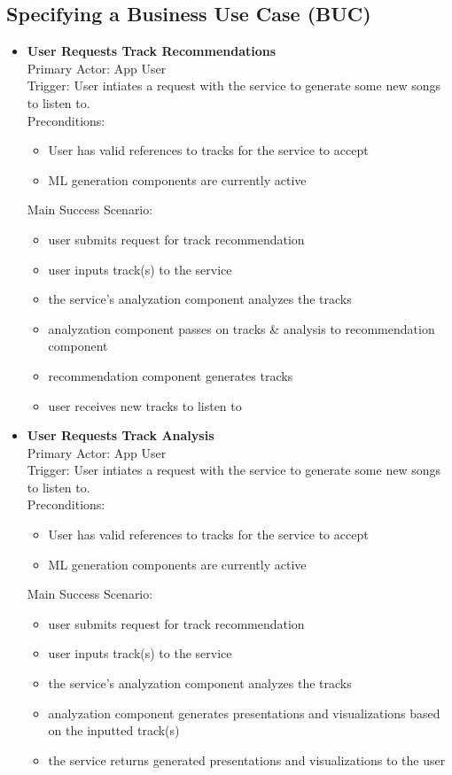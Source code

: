 \documentclass[12pt]{article}
\begin{document}
\subsection{Specifying a Business Use Case (BUC)}
\begin{itemize}
  \item \textbf{User Requests Track Recommendations}
    \\Primary Actor: App User
    \\Trigger: User intiates a request with the service to generate some new songs to listen to. 
    \\Preconditions: 
    \begin{itemize}
    \item User has valid references to tracks for the service to accept
    \item ML generation components are currently active
    \end{itemize}

    Main Success Scenario: 
    \begin{itemize}
    \item user submits request for track recommendation
    \item user inputs track(s) to the service
    \item the service's analyzation component analyzes the tracks
    \item analyzation component passes on tracks \& analysis to recommendation component
    \item recommendation component generates tracks
    \item user receives new tracks to listen to
    \end{itemize}
  
  \item \textbf{User Requests Track Analysis}
    \\Primary Actor: App User
    \\Trigger: User intiates a request with the service to generate some new songs to listen to. 
    \\Preconditions: 
    \begin{itemize}
    \item User has valid references to tracks for the service to accept
    \item ML generation components are currently active
    \end{itemize}

    Main Success Scenario: 
    \begin{itemize}
    \item user submits request for track recommendation
    \item user inputs track(s) to the service
    \item the service's analyzation component analyzes the tracks
    \item analyzation component generates presentations and visualizations based on the inputted track(s)
    \item the service returns generated presentations and visualizations to the user
    \end{itemize}
  

\end{itemize}
\end{document}
